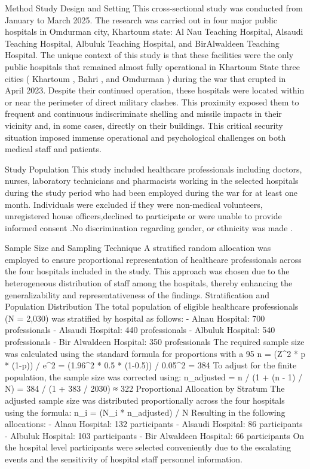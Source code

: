 Method
 Study Design and Setting 
This cross-sectional study was conducted from January to March 2025. The research was carried out in four major public hospitals in Omdurman city, Khartoum state: Al Nau Teaching Hospital, Alsaudi Teaching Hospital, Albuluk Teaching Hospital, and BirAlwaldeen Teaching Hospital.
The unique context of this study is that these facilities were the only public hospitals that remained almost fully operational in Khartoum State three cities ( Khartoum , Bahri , and Omdurman ) during the war that erupted in April 2023. Despite their continued operation, these hospitals were located within or near the perimeter of direct military clashes. This proximity exposed them to frequent and continuous indiscriminate shelling and missile impacts in their vicinity and, in some cases, directly on their buildings. This critical security situation imposed immense operational and psychological challenges on both medical staff and patients.

Study Population 
This study included healthcare professionals including doctors, nurses, laboratory technicians and pharmacists working in the selected hospitals during the study period who had been employed during the war for at least one month. Individuals were excluded if they were non-medical volunteers, unregistered house officers,declined to participate or were unable to provide informed consent .No discrimination regarding gender, or ethnicity was made .

Sample Size and Sampling Technique 
A stratified random allocation  was employed to ensure proportional representation of healthcare professionals across the four hospitals included in the study. This approach was chosen due to the heterogeneous distribution of staff among the hospitals, thereby enhancing the generalizability and representativeness of the findings.
Stratification and Population Distribution
The total population of eligible healthcare professionals (N = 2,030) was stratified by hospital as follows:
- Alnau Hospital: 700 professionals
- Alsaudi Hospital: 440 professionals
- Albuluk Hospital: 540 professionals
- Bir Alwaldeen Hospital: 350 professionals
The required sample size was calculated using the standard formula for proportions with a 95%
n = (Z^2 * p * (1-p)) / e^2 = (1.96^2 * 0.5 * (1-0.5)) / 0.05^2 = 384
To adjust for the finite population, the sample size was corrected using:
n_adjusted = n / (1 + (n - 1) / N) = 384 / (1 + 383 / 2030) ≈ 322
Proportional Allocation by Stratum
The adjusted sample size was distributed proportionally across the four hospitals using the formula:
n_i = (N_i * n_adjusted) / N
Resulting in the following allocations:
- Alnau Hospital: 132 participants
- Alsaudi Hospital: 86 participants
- Albuluk Hospital: 103 participants
- Bir Alwaldeen Hospital: 66 participants
On the hospital level participants were selected conveniently due to the escalating events and the sensitivity of hospital staff personnel information. 

